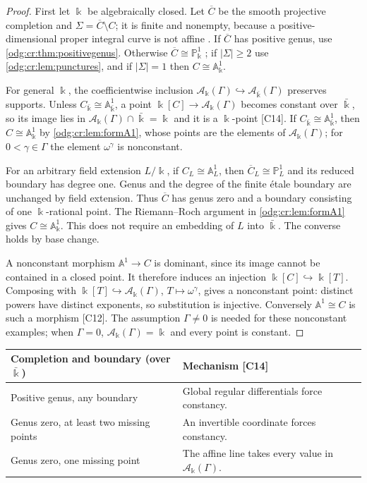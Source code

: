\documentclass[11pt,oneside]{article}
\numberwithin{equation}{section}
\theoremstyle{definition}
\theoremstyle{remark}
\newcommand{\src}[1]{\textup{\textsf{\small[#1]}}}
\newcommand{\crA}{\mathcal A_\Bbbk(\Gamma)}
\newcommand{\Aff}{\mathbb A}
\begin{document}
\begin{proof}
First let $\Bbbk$ be algebraically closed. Let $\overline C$ be the smooth projective
completion and $\Sigma=\overline C\setminus C$; it is finite and nonempty, because a
positive-dimensional proper integral curve is not affine
\cite{StacksCurveCompletion}. If
$\overline C$ has positive genus, use \cref{odg:cr:thm:positivegenus}. Otherwise
$\overline C\cong\mathbb P^1_\Bbbk$ \cite{StacksGenusZero}; if $|\Sigma|\ge2$ use
\cref{odg:cr:lem:punctures}, and if $|\Sigma|=1$ then $C\cong\Aff^1_\Bbbk$.

For general $\Bbbk$, the coefficientwise inclusion
$\crA\hookrightarrow\mathcal A_{\bar\Bbbk}(\Gamma)$ preserves supports. Unless
$C_{\bar\Bbbk}\cong\Aff^1_{\bar\Bbbk}$, a point $\Bbbk[C]\to\crA$ becomes constant over
$\bar\Bbbk$, so its image lies in $\crA\cap\bar\Bbbk=\Bbbk$ and it is a $\Bbbk$-point
\src{C14}. If $C_{\bar\Bbbk}\cong\Aff^1_{\bar\Bbbk}$, then $C\cong\Aff^1_\Bbbk$ by
\cref{odg:cr:lem:formA1}, whose points are the elements of $\crA$; for
$0<\gamma\in\Gamma$ the element $\omega^\gamma$ is nonconstant.

For an arbitrary field extension $L/\Bbbk$, if $C_L\cong\Aff^1_L$, then
$\overline C_L\cong\mathbb P^1_L$ and its reduced boundary has degree one.
Genus and the degree of the finite \'etale boundary are unchanged by field
extension. Thus $\overline C$ has genus zero and a boundary consisting of one
$\Bbbk$-rational point. The Riemann--Roch argument in
\cref{odg:cr:lem:formA1} gives $C\cong\Aff^1_\Bbbk$. This does not require an
embedding of $L$ into $\bar\Bbbk$. The converse holds by base change.

A nonconstant morphism $\Aff^1\to C$ is dominant, since its image cannot be
contained in a closed point. It therefore induces an injection
$\Bbbk[C]\hookrightarrow\Bbbk[T]$. Composing with
$\Bbbk[T]\hookrightarrow\crA$, $T\mapsto\omega^\gamma$, gives a nonconstant
point: distinct powers have distinct exponents, so substitution is injective.
Conversely $\Aff^1\cong C$ is such a morphism \src{C12}. The assumption
$\Gamma\ne0$ is needed for these nonconstant examples; when $\Gamma=0$,
$\crA=\Bbbk$ and every point is constant.
\end{proof}

\begin{center}
\renewcommand{\arraystretch}{1.15}
\begin{tabular}{>{\raggedright\arraybackslash}p{}>{\raggedright\arraybackslash}p{}}
\toprule
Completion and boundary (over $\bar\Bbbk$) & Mechanism \src{C14}\\
\midrule
Positive genus, any boundary & Global regular differentials force constancy.\\
Genus zero, at least two missing points & An invertible coordinate forces constancy.\\
Genus zero, one missing point & The affine line takes every value in $\crA$.\\
\bottomrule
\end{tabular}
\end{center}
\end{document}
